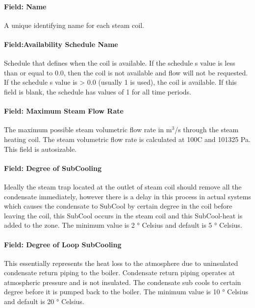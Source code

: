 \paragraph{Field: Name}\label{field-name-2-018}

A unique identifying name for each steam coil.

\paragraph{Field:Availability Schedule Name}\label{fieldavailability-schedule-name-2-000}

Schedule that defines when the coil is available. If the schedule s value is less than or equal to 0.0, then the coil is not available and flow will not be requested. If the schedule s value is \textgreater{} 0.0 (usually 1 is used), the coil is available. If this field is blank, the schedule has values of 1 for all time periods.

\paragraph{Field: Maximum Steam Flow Rate}\label{field-maximum-steam-flow-rate}

The maximum possible steam volumetric flow rate in m\(^{3}\)/s through the steam heating coil. The steam volumetric flow rate is calculated at 100C and 101325 Pa. This field is autosizable.

\paragraph{Field: Degree of SubCooling}\label{field-degree-of-subcooling}

Ideally the steam trap located at the outlet of steam coil should remove all the condensate immediately, however there is a delay in this process in actual systems which causes the condensate to SubCool by certain degree in the coil before leaving the coil, this SubCool occurs in the steam coil and this SubCool-heat is added to the zone. The minimum value is 2 ° Celsius and default is 5 ° Celsius.

\paragraph{Field: Degree of Loop SubCooling}\label{field-degree-of-loop-subcooling}

This essentially represents the heat loss to the atmosphere due to uninsulated condensate return piping to the boiler. Condensate return piping operates at atmospheric pressure and is not insulated. The condensate sub cools to certain degree before it is pumped back to the boiler. The minimum value is 10 ° Celsius and default is 20 ° Celsius.


